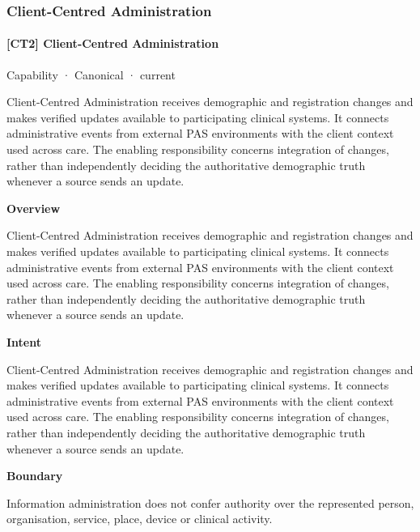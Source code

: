 \subsubsection{Client-Centred Administration}

\paragraph{[CT2] Client-Centred Administration}

\label{element:8752b7a937754b2faa296300c6a48911}
{\small Capability · Canonical · current}\par

Client-Centred Administration receives demographic and registration changes and makes verified updates available to participating clinical systems. It connects administrative events from external PAS environments with the client context used across care. The enabling responsibility concerns integration of changes, rather than independently deciding the authoritative demographic truth whenever a source sends an update.



\textbf{Overview}



Client-Centred Administration receives demographic and registration changes and makes verified updates available to participating clinical systems. It connects administrative events from external PAS environments with the client context used across care. The enabling responsibility concerns integration of changes, rather than independently deciding the authoritative demographic truth whenever a source sends an update.



\textbf{Intent}



Client-Centred Administration receives demographic and registration changes and makes verified updates available to participating clinical systems. It connects administrative events from external PAS environments with the client context used across care. The enabling responsibility concerns integration of changes, rather than independently deciding the authoritative demographic truth whenever a source sends an update.



\textbf{Boundary}



Information administration does not confer authority over the represented person, organisation, service, place, device or clinical activity.



